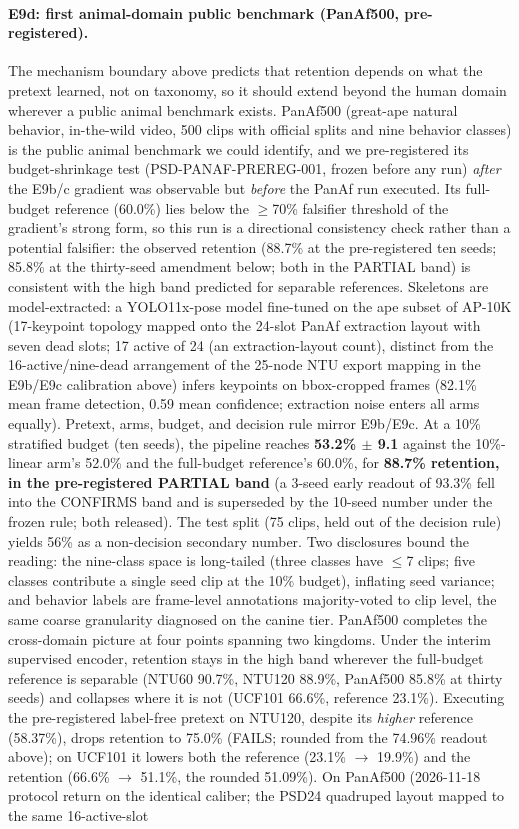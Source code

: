 \paragraph{E9d: first animal-domain public benchmark (PanAf500, pre-registered).}
The mechanism boundary above predicts that retention depends on what the pretext learned, not on taxonomy, so it should extend beyond the human domain wherever a public animal benchmark exists. PanAf500 (great-ape natural behavior, in-the-wild video, 500 clips with official splits and nine behavior classes) is the public animal benchmark we could identify, and we pre-registered its budget-shrinkage test (PSD-PANAF-PREREG-001, frozen before any run) \emph{after} the E9b/c gradient was observable but \emph{before} the PanAf run executed. Its full-budget reference (60.0\%) lies below the $\geq$70\% falsifier threshold of the gradient's strong form, so this run is a directional consistency check rather than a potential falsifier: the observed retention (88.7\% at the pre-registered ten seeds; 85.8\% at the thirty-seed amendment below; both in the PARTIAL band) is consistent with the high band predicted for separable references. Skeletons are model-extracted: a YOLO11x-pose model fine-tuned on the ape subset of AP-10K (17-keypoint topology mapped onto the 24-slot PanAf extraction layout with seven dead slots; 17 active of 24 (an extraction-layout count), distinct from the 16-active/nine-dead arrangement of the 25-node NTU export mapping in the E9b/E9c calibration above) infers keypoints on bbox-cropped frames (82.1\% mean frame detection, 0.59 mean confidence; extraction noise enters all arms equally). Pretext, arms, budget, and decision rule mirror E9b/E9c. At a 10\% stratified budget (ten seeds), the pipeline reaches \textbf{53.2\% $\pm$ 9.1} against the 10\%-linear arm's 52.0\% and the full-budget reference's 60.0\%, for \textbf{88.7\% retention, in the pre-registered PARTIAL band} (a 3-seed early readout of 93.3\% fell into the CONFIRMS band and is superseded by the 10-seed number under the frozen rule; both released). The test split (75 clips, held out of the decision rule) yields 56\% as a non-decision secondary number. Two disclosures bound the reading: the nine-class space is long-tailed (three classes have $\le$7 clips; five classes contribute a single seed clip at the 10\% budget), inflating seed variance; and behavior labels are frame-level annotations majority-voted to clip level, the same coarse granularity diagnosed on the canine tier. PanAf500 completes the cross-domain picture at four points spanning two kingdoms. Under the interim supervised encoder, retention stays in the high band wherever the full-budget reference is separable (NTU60 90.7\%, NTU120 88.9\%, PanAf500 85.8\% at thirty seeds) and collapses where it is not (UCF101 66.6\%, reference 23.1\%). Executing the pre-registered label-free pretext on NTU120, despite its \emph{higher} reference (58.37\%), drops retention to 75.0\% (FAILS; rounded from the 74.96\% readout above); on UCF101 it lowers both the reference (23.1\% $\to$ 19.9\%) and the retention (66.6\% $\to$ 51.1\%, the rounded 51.09\%). On PanAf500 (2026-11-18 protocol return on the identical caliber; the PSD24 quadruped layout mapped to the same 16-active-slot 